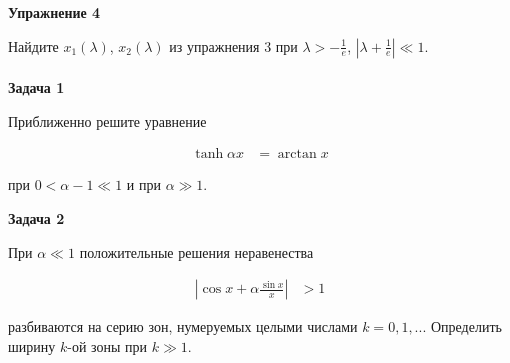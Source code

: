 \documentclass[a4paper,12pt]{article}
\begin{document}
\vspace{15pt}
\noindent \textbf{Упражнение 4}

\noindent Найдите $x_{1}(\lambda)$, $x_{2}(\lambda)$ из упражнения 3 при $\lambda>-\frac{1}{e}$, $|\lambda+\frac{1}{e}|\ll 1$. \\\\

\vspace{15pt}
\noindent \textbf{Задача 1}

\noindent Приближенно решите уравнение

\noindent 
\begin{align*}
\tanh\alpha x & =\arctan x
\end{align*}

\noindent при $0<\alpha-1\ll 1$ и при $\alpha\gg1$.

\vspace{15pt}
\noindent \textbf{Задача 2}

\noindent При $\alpha\ll 1$ положительные решения неравенества

\noindent 
\begin{align*}
\left|\cos x+\alpha\frac{\sin x}{x}\right| & >1
\end{align*}

\noindent разбиваются на серию зон, нумеруемых целыми числами $k=0,1,...$ Определить ширину $k$-ой зоны при $k\gg1$.
\end{document}
